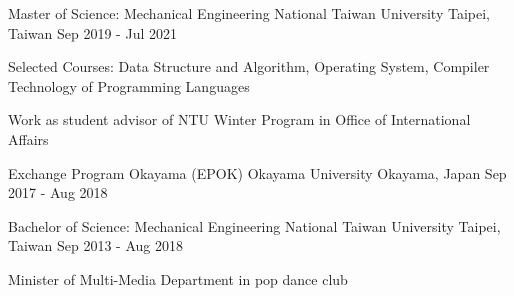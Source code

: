 \begin{cventries}
  \cventry
    {Master of Science: Mechanical Engineering} %
    {National Taiwan University} %
    {Taipei, Taiwan} %
    {Sep 2019 - Jul 2021} %
    {
      \begin{cvitems} %
        \item {Selected Courses: Data Structure and Algorithm, Operating System, Compiler Technology of Programming Languages }
        \item {Work as student advisor of NTU Winter Program in Office of International Affairs}
      \end{cvitems}
    }

  \cventry
    {Exchange Program Okayama (EPOK)} %
    {Okayama University} %
    {Okayama, Japan} %
    {Sep 2017 - Aug 2018} %
    {
    }
    \vspace{-\baselineskip}

  \cventry
    {Bachelor of Science: Mechanical Engineering} %
    {National Taiwan University} %
    {Taipei, Taiwan} %
    {Sep 2013 - Aug 2018} %
    {
      \begin{cvitems} %
        \item {Minister of Multi-Media Department in pop dance club}
      \end{cvitems}
    }
\end{cventries}
